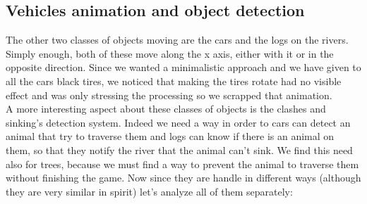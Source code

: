 \documentclass[a4paper, 11pt]{article}
\begin{document}
\subsection{Vehicles animation and object detection}
The other two classes of objects moving are the cars and the logs on the rivers.\\
Simply enough, both of these move along the x axis, either with it or in the opposite direction. Since we wanted a minimalistic approach and we have given to all the cars black tires, we noticed that making the tires rotate had no visible effect and was only stressing the processing so we scrapped that animation.\\
A more interesting aspect about these classes of objects is the clashes and sinking's detection system. Indeed we need a way in order to cars can detect an animal that try to traverse them and logs can know if there is an animal on them, so that they notify the river that the animal can't sink. We find this need also for trees, because we must find a way to prevent the animal to traverse them without finishing the game. Now since they are handle in different ways (although they are very similar in spirit) let's analyze all of them separately:
\end{document}
